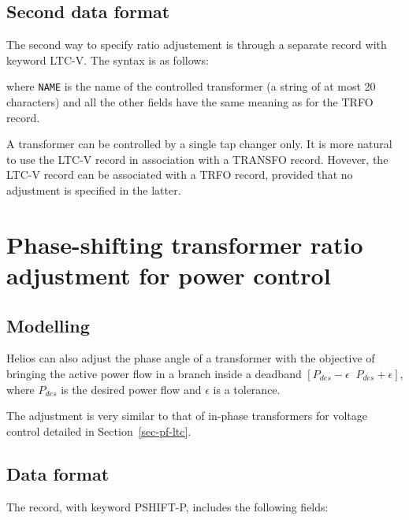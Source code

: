 \subsection{Second data format}

The second way to specify ratio adjustement is through a separate record with keyword LTC-V. The syntax is as follows:

\hspace*{5ex}{\tt LTC-V NAME CON\_BUS NFIRST NLAST NBPOS TOLV VDES ;}

where {\tt NAME} is the name of the controlled transformer (a string of at most 20 characters) and all the other fields have the same meaning as for the TRFO record.

A transformer can be controlled by a single tap changer only. It is more natural to use the LTC-V record in association with a TRANSFO record. Hovever, the LTC-V record can be associated with a TRFO record, provided that no adjustment is specified in the latter. 



\section{Phase-shifting transformer ratio adjustment for power control}

\subsection{Modelling}

Helios can also adjust the phase angle of a transformer with the objective of bringing the active power flow in a branch inside a deadband $[P_{des}-\epsilon \;\; P_{des}+\epsilon]$, where $P_{des}$ is the desired power flow and $\epsilon$ is a tolerance.

The adjustment is very similar to that of in-phase transformers for voltage control detailed in  Section~\ref{sec-pf-ltc}.

\subsection{Data format}

The record, with keyword PSHIFT-P, includes the following fields:

\hspace*{5ex}{\tt PSHIFT-P CONTRFO MONBRANCH PHAFIRST PHALAST NBPOS SIGN PDES TOLP ;}

